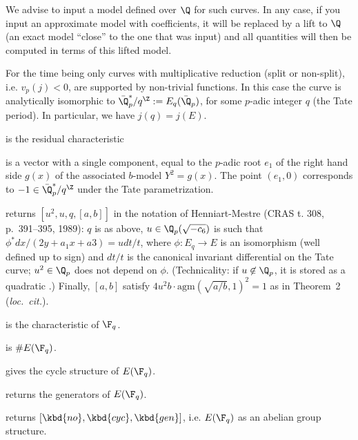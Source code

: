 We advise to input a model defined over $\Q$ for such curves. In any case,
if you input an approximate model with  coefficients, it will be
replaced by a lift to $\Q$ (an exact model ``close'' to the one that was
input) and all quantities will then be computed in terms of this lifted
model.

For the time being only curves with multiplicative reduction (split or
non-split), i.e. $v_p(j) < 0$, are supported by non-trivial functions. In
this case the curve is analytically isomorphic to $\bar{\Q}_p^*/q^\Z :=
E_q(\bar{\Q}_p)$, for some $p$-adic integer $q$ (the Tate period). In
particular, we have $j(q) = j(E)$.

\item {} is the residual characteristic

\item {} is a vector with a single component, equal to the $p$-adic
root $e_1$ of the right hand side $g(x)$ of the associated $b$-model $Y^2
= g(x)$. The point $(e_1,0)$ corresponds to $-1 \in \bar{\Q}_p^*/q^\Z$
under the Tate parametrization.

\item {} returns $[u^2,u,q,[a,b]]$ in the notation of Henniart-Mestre
(CRAS t. 308, p.~391--395, 1989): $q$ is as above, $u\in \Q_p(\sqrt{-c_6})$
is such that $\phi^* dx/(2y + a_1x+a3) = u dt/t$, where $\phi: E_q\to E$
is an isomorphism (well defined up to sign) and $dt/t$ is the canonical
invariant differential on the Tate curve; $u^2\in\Q_p$ does not depend on
$\phi$. (Technicality: if $u\not\in\Q_p$, it is stored as a quadratic
.)
Finally, $[a,b]$ satisfy $4u^2 b \cdot \text{agm}(\sqrt{a/b},1)^2 = 1$
as in Theorem~2 (\emph{loc.~cit.}).


\item {} is the characteristic of $\F_q$.

\item {} is $\#E(\F_q)$.

\item {} gives the cycle structure of $E(\F_q)$.

\item {} returns the generators of $E(\F_q)$.

\item {} returns $[\kbd{no},\kbd{cyc},\kbd{gen}]$, i.e. $E(\F_q)$
as an abelian group structure.


